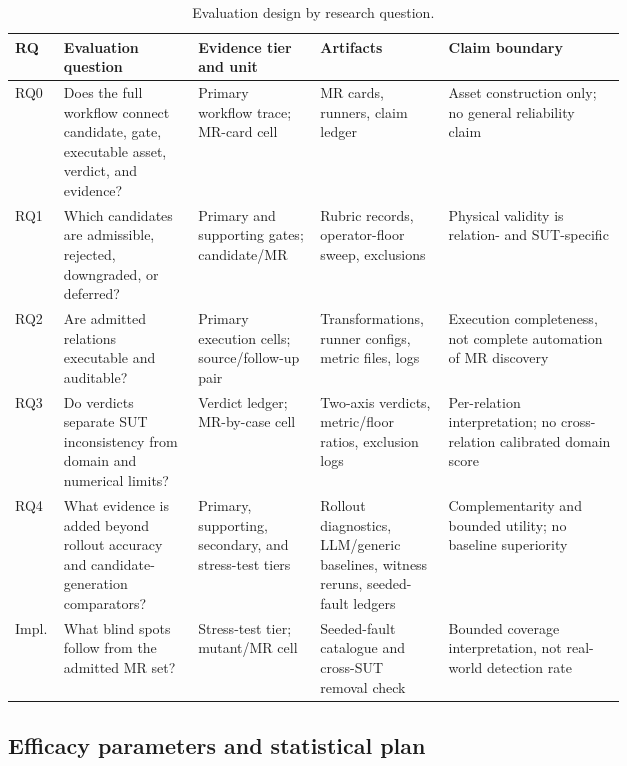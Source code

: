 \documentclass[preprint,12pt]{elsarticle}
\begin{document}
\begin{table}[H]
\centering
\caption{Evaluation design by research question.}
\label{tab:rqmap}
\scriptsize
\setlength{\tabcolsep}{1.5pt}
\begin{tabularx}{\linewidth}{@{}>{\raggedright\arraybackslash}p{0.08\linewidth}>{\raggedright\arraybackslash}p{0.22\linewidth}>{\raggedright\arraybackslash}p{0.20\linewidth}>{\raggedright\arraybackslash}p{0.21\linewidth}Y@{}}
\toprule
\textbf{RQ} & \textbf{Evaluation question} & \textbf{Evidence tier and unit} & \textbf{Artifacts} & \textbf{Claim boundary} \\
\midrule
RQ0 & Does the full workflow connect candidate, gate, executable asset, verdict, and evidence? & Primary workflow trace; MR-card cell & MR cards, runners, claim ledger & Asset construction only; no general reliability claim \\
RQ1 & Which candidates are admissible, rejected, downgraded, or deferred? & Primary and supporting gates; candidate/MR & Rubric records, operator-floor sweep, exclusions & Physical validity is relation- and SUT-specific \\
RQ2 & Are admitted relations executable and auditable? & Primary execution cells; source/follow-up pair & Transformations, runner configs, metric files, logs & Execution completeness, not complete automation of MR discovery \\
RQ3 & Do verdicts separate SUT inconsistency from domain and numerical limits? & Verdict ledger; MR-by-case cell & Two-axis verdicts, metric/floor ratios, exclusion logs & Per-relation interpretation; no cross-relation calibrated domain score \\
RQ4 & What evidence is added beyond rollout accuracy and candidate-generation comparators? & Primary, supporting, secondary, and stress-test tiers & Rollout diagnostics, LLM/generic baselines, witness reruns, seeded-fault ledgers & Complementarity and bounded utility; no baseline superiority \\
Impl. & What blind spots follow from the admitted MR set? & Stress-test tier; mutant/MR cell & Seeded-fault catalogue and cross-SUT removal check & Bounded coverage interpretation, not real-world detection rate \\
\bottomrule
\end{tabularx}
\end{table}

\subsection{Efficacy parameters and statistical plan}
\label{subsec:efficacy}
\end{document}
